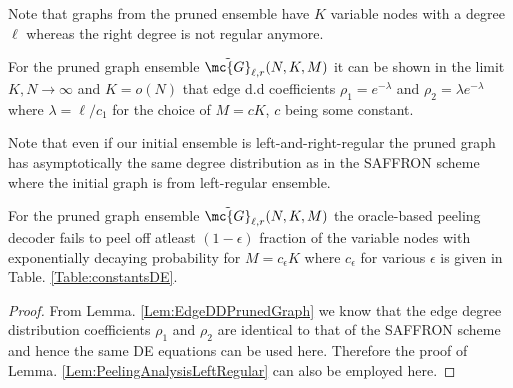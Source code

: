 \documentclass[conference,,twocolumn]{IEEEtran}
\def\ceps{c_{\epsilon}}
\begin{document}
Note that graphs from the pruned ensemble have $K$ variable nodes with a degree $\ell$ whereas the right degree is not regular anymore. 

\begin{lemma}
\label{Lem:EdgeDDPrunedGraph}
For the pruned graph ensemble $\tilde{\mc{G}}_{\ell,r}(N,K,M)$ it can be shown in the limit $K,N\rightarrow\infty$ and $K=o(N)$ that edge d.d coefficients $\rho_{1}=e^{-\lambda}$ and $\rho_{2}=\lambda e^{-\lambda}$ where $\lambda=\ell/c_1$ for the choice of $M=cK$, $c$ being some constant.
\end{lemma}

Note that even if our initial ensemble is left-and-right-regular the pruned graph has asymptotically the same degree distribution as in the SAFFRON scheme where the initial graph is from left-regular ensemble.

\begin{lemma}
\label{Lem:PeelingRegularAnalysis}
For the pruned graph ensemble $\tilde{\mc{G}}_{\ell,r}(N, K,M)$ the oracle-based peeling decoder fails to peel off atleast $(1-\epsilon)$ fraction of the variable nodes with exponentially decaying probability for $M=\ceps K$ where $\ceps$ for various $\epsilon$ is given in Table. \ref{Table:constantsDE}.
\end{lemma}
\begin{proof}
From Lemma. \ref{Lem:EdgeDDPrunedGraph} we know that the edge degree distribution coefficients $\rho_1$ and $\rho_2$ are identical to that of the SAFFRON scheme and hence the same DE equations can be used here. Therefore the proof of Lemma. \ref{Lem:PeelingAnalysisLeftRegular} can also be employed here.
\end{proof}
\end{document}
